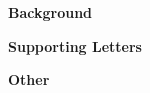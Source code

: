 \label{ListOfExhibits}

\textbf{\Large Background}

\textbf{\Large Supporting Letters}

\textbf{\Large Other}

\pagebreak
